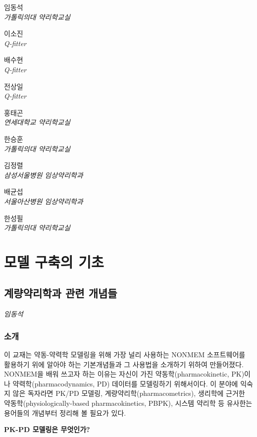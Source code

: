 \documentclass[
  10pt,
  krantz2,
  a4paper]{krantz}
\theoremstyle{definition}
\theoremstyle{definition}
\theoremstyle{definition}
\theoremstyle{remark}
\begin{document}
임동석\\
\emph{가톨릭의대 약리학교실}

이소진\\
\emph{Q-fitter}

배수현\\
\emph{Q-fitter}

전상일\\
\emph{Q-fitter}

홍태곤\\
\emph{연세대학교 약리학교실}

한승훈\\
\emph{가톨릭의대 약리학교실}

김정렬\\
\emph{삼성서울병원 임상약리학과}

배균섭\\
\emph{서울아산병원 임상약리학과}

한성필\\
\emph{가톨릭의대 약리학교실}

\hypertarget{part-uxbaa8uxb378-uxad6cuxcd95uxc758-uxae30uxcd08}{%
\part{모델 구축의 기초}\label{part-uxbaa8uxb378-uxad6cuxcd95uxc758-uxae30uxcd08}}

\hypertarget{intro}{%
\chapter{계량약리학과 관련 개념들}\label{intro}}

\emph{임동석}

\hypertarget{uxc18cuxac1c}{%
\section{소개}\label{uxc18cuxac1c}}

이 교재는 약동-약력학 모델링을 위해 가장 널리 사용하는 NONMEM 소프트웨어를 활용하기 위에 알아야 하는 기본개념들과 그 사용법을 소개하기 위하여 만들어졌다. NONMEM을 배워 쓰고자 하는 이유는 자신이 가진 약동학(pharmacokinetic, PK)이나 약력학(pharmacodynamics, PD) 데이터를 모델링하기 위해서이다. 이 분야에 익숙지 않은 독자라면 PK/PD 모델링, 계량약리학(pharmacometrics), 생리학에 근거한 약동학(physiologically-based pharmacokinetics, PBPK), 시스템 약리학 등 유사한는 용어들의 개념부터 정리해 볼 필요가 있다.

\textbf{PK-PD 모델링은 무엇인가?}
\end{document}
